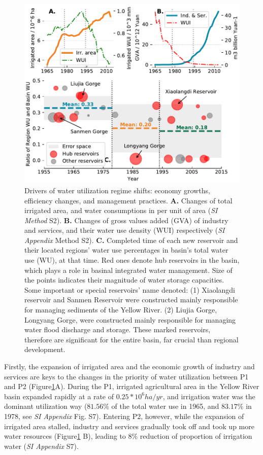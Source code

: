 \documentclass[9pt, twocolumn, twoside, lineno]{pnas-new}
\begin{document}
\begin{figure}[th!]
	\centering
	\includegraphics[width=\linewidth]{../../figures/main/causes.pdf}
	\caption{
		Drivers of water utilization regime shifts: economy growths, efficiency changes, and management practices.
		\textbf{A.} Changes of total irrigated area, and water consumptions in per unit of area (\textit{SI Method} S2).
		\textbf{B.} Changes of gross values added (GVA) of industry and services, and their water use density (WUI) respectively (\textit{SI Appendix} Method S2).
		\textbf{C.} Completed time of each new reservoir and their located regions' water use percentages in basin's total water use (WU), at that time. Red ones denote hub reservoirs in the basin, which plays a role in basinal integrated water management. Size of the points indicates their magnitude of water storage capacities. Some important or special reservoirs' name denoted: (1) Xiaolangdi reservoir and Sanmen Reservoir were constructed mainly responsible for managing sediments of the Yellow River. (2) Liujia Gorge, Longyang Gorge, were constructed mainly responsible for managing water flood discharge and storage. These marked reservoirs, therefore are significant for the entire basin, far crucial than regional development.
	}
	\label{fig:Causes}
\end{figure}

Firstly, the expansion of irrigated area and the economic growth of industry and services are keys to the changes in the priority of water utilization between P1 and P2 (Figure\ref{fig:Causes}A). During the P1, irrigated agricultural area in the Yellow River basin expanded rapidly at a rate of $0.25*10^6 ha/yr$, and irrigation water was the dominant utilization way ($81.56\%$ of the total water use in 1965, and $83.17\%$ in 1978, see \textit{SI Appendix} Fig. S7). Entering P2, however, while the expansion of irrigated area stalled, industry and services gradually took off and took up more water resources (Figure\ref{fig:Causes} B), leading to $8\%$ reduction of proportion of irrigation water (\textit{SI Appendix} S7).
\end{document}
